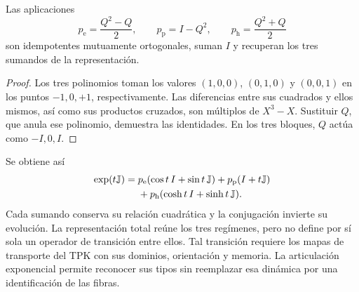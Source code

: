 \begin{proposition}
\label{x_reciprocidad:euler-trit-proyectores}
Las aplicaciones
\[
 p_{\mathrm e}=\frac{Q^2-Q}{2},\qquad
 p_{\mathrm p}=I-Q^2,\qquad
 p_{\mathrm h}=\frac{Q^2+Q}{2}
\]
son idempotentes mutuamente ortogonales, suman \(I\) y recuperan los tres
sumandos de la representación.
\end{proposition}
\begin{proof}
Los tres polinomios toman los valores \((1,0,0)\), \((0,1,0)\) y
\((0,0,1)\) en los puntos \(-1,0,+1\), respectivamente. Las diferencias
entre sus cuadrados y ellos mismos, así como sus productos cruzados, son
múltiplos de \(X^3-X\). Sustituir \(Q\), que anula ese polinomio, demuestra
las identidades. En los tres bloques, \(Q\) actúa como \(-I,0,I\).
\end{proof}

Se obtiene así
\begin{align}
 \exp(t\mathbb J)
 ={}&p_{\mathrm e}(\cos t\,I+\sin t\,\mathbb J)
   +p_{\mathrm p}(I+t\mathbb J)\notag\\
   &+p_{\mathrm h}(\cosh t\,I+\sinh t\,\mathbb J).
 \label{x_reciprocidad:euler-trit-exponencial-total}
\end{align}
Cada sumando conserva su relación cuadrática y la conjugación invierte
su evolución. La representación total reúne los tres regímenes, pero no
define por sí sola un operador de transición entre ellos. Tal transición
requiere los mapas de transporte del TPK con sus dominios, orientación y
memoria. La articulación exponencial permite reconocer sus tipos sin
reemplazar esa dinámica por una identificación de las fibras.


